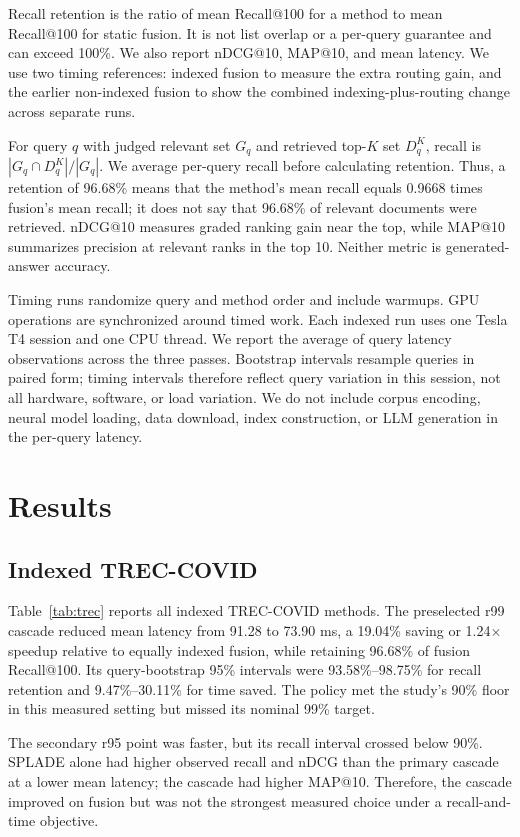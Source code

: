 \documentclass[conference]{IEEEtran}
\begin{document}
Recall retention is the ratio of mean Recall@100 for a method to mean Recall@100 for static fusion. It is not list overlap or a per-query guarantee and can exceed 100\%. We also report nDCG@10, MAP@10, and mean latency. We use two timing references: indexed fusion to measure the extra routing gain, and the earlier non-indexed fusion to show the combined indexing-plus-routing change across separate runs.

For query $q$ with judged relevant set $G_q$ and retrieved top-$K$ set $D_q^K$, recall is $|G_q\cap D_q^K|/|G_q|$. We average per-query recall before calculating retention. Thus, a retention of 96.68\% means that the method's mean recall equals 0.9668 times fusion's mean recall; it does not say that 96.68\% of relevant documents were retrieved. nDCG@10 measures graded ranking gain near the top, while MAP@10 summarizes precision at relevant ranks in the top 10. Neither metric is generated-answer accuracy.

Timing runs randomize query and method order and include warmups. GPU operations are synchronized around timed work. Each indexed run uses one Tesla T4 session and one CPU thread. We report the average of query latency observations across the three passes. Bootstrap intervals resample queries in paired form; timing intervals therefore reflect query variation in this session, not all hardware, software, or load variation. We do not include corpus encoding, neural model loading, data download, index construction, or LLM generation in the per-query latency.

\section{Results}
\subsection{Indexed TREC-COVID}
Table~\ref{tab:trec} reports all indexed TREC-COVID methods. The preselected r99 cascade reduced mean latency from 91.28 to 73.90 ms, a 19.04\% saving or 1.24$\times$ speedup relative to equally indexed fusion, while retaining 96.68\% of fusion Recall@100. Its query-bootstrap 95\% intervals were 93.58\%--98.75\% for recall retention and 9.47\%--30.11\% for time saved. The policy met the study's 90\% floor in this measured setting but missed its nominal 99\% target.

The secondary r95 point was faster, but its recall interval crossed below 90\%. SPLADE alone had higher observed recall and nDCG than the primary cascade at a lower mean latency; the cascade had higher MAP@10. Therefore, the cascade improved on fusion but was not the strongest measured choice under a recall-and-time objective.
\end{document}
